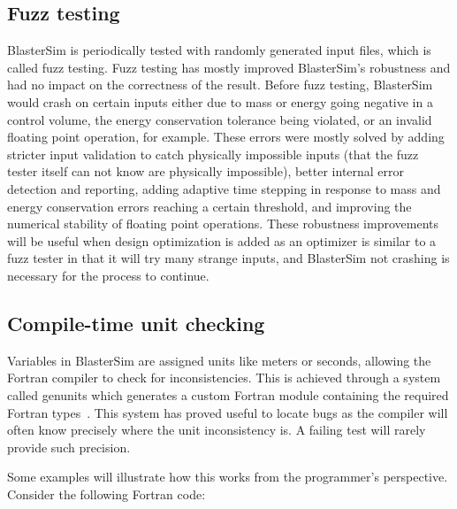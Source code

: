 \subsection{Fuzz testing}\label{fuzz-testing}

BlasterSim is periodically tested with randomly generated input files, which is called fuzz testing.
Fuzz testing has mostly improved BlasterSim's robustness and had no impact on the correctness of the result.
Before fuzz testing, BlasterSim would crash on certain inputs either due to mass or energy going negative in a control volume, the energy conservation tolerance being violated, or an invalid floating point operation, for example.
These errors were mostly solved by adding stricter input validation to catch physically impossible inputs (that the fuzz tester itself can not know are physically impossible), better internal error detection and reporting, adding adaptive time stepping in response to mass and energy conservation errors reaching a certain threshold, and improving the numerical stability of floating point operations.
These robustness improvements will be useful when design optimization is added as an optimizer is similar to a fuzz tester in that it will try many strange inputs, and BlasterSim not crashing is necessary for the process to continue.


\subsection{Compile-time unit checking}\label{unit-checking}

Variables in BlasterSim are assigned units like meters or seconds, allowing the Fortran compiler to check for inconsistencies.
This is achieved through a system called genunits which generates a custom Fortran module containing the required Fortran types~\cite{trettel_compile-time_2025,trettel_btrettelflt_2026}.
This system has proved useful to locate bugs as the compiler will often know precisely where the unit inconsistency is.
A failing test will rarely provide such precision.

Some examples will illustrate how this works from the programmer's perspective.
Consider the following Fortran code:



